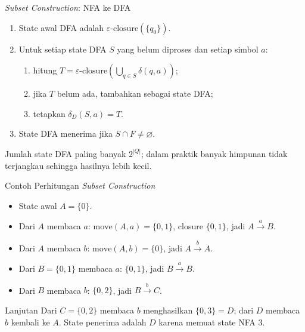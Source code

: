 \documentclass[aspectratio=169,10pt,t]{beamer}
\begin{document}
\begin{frame}{\textit{Subset Construction}: NFA ke DFA}
  \begin{enumerate}
    \setlength{\itemsep}{2pt}
    \item State awal DFA adalah \(\varepsilon\text{-closure}(\{q_0\})\).
    \item Untuk setiap state DFA \(S\) yang belum diproses dan setiap
          simbol \(a\):
          \begin{enumerate}
            \item hitung
                  \(T=\varepsilon\text{-closure}(\bigcup_{q\in S}
                  \delta(q,a))\);
            \item jika \(T\) belum ada, tambahkan sebagai state DFA;
            \item tetapkan \(\delta_D(S,a)=T\).
          \end{enumerate}
    \item State DFA menerima jika \(S \cap F \neq \varnothing\).
  \end{enumerate}

  \vspace{4pt}
  {\footnotesize Jumlah state DFA paling banyak \(2^{|Q|}\); dalam
  praktik banyak himpunan tidak terjangkau sehingga hasilnya lebih
  kecil.}
\end{frame}

\begin{frame}{Contoh Perhitungan \textit{Subset Construction}}
  \small
  \begin{itemize}
    \item State awal \(A=\{0\}\).
    \item Dari \(A\) membaca \(a\): \(\mathrm{move}(A,a)=\{0,1\}\),
          closure \(\{0,1\}\), jadi \(A \xrightarrow{a} B\).
    \item Dari \(A\) membaca \(b\): \(\mathrm{move}(A,b)=\{0\}\), jadi
          \(A \xrightarrow{b} A\).
    \item Dari \(B=\{0,1\}\) membaca \(a\): \(\{0,1\}\), jadi
          \(B \xrightarrow{a} B\).
    \item Dari \(B\) membaca \(b\): \(\{0,2\}\), jadi
          \(B \xrightarrow{b} C\).
  \end{itemize}

  \vspace{4pt}
  \begin{block}{Lanjutan}
    \footnotesize
    Dari \(C=\{0,2\}\) membaca \(b\) menghasilkan \(\{0,3\}=D\); dari
    \(D\) membaca \(b\) kembali ke \(A\). State penerima adalah \(D\)
    karena memuat state NFA 3.
  \end{block}
\end{frame}
\end{document}
